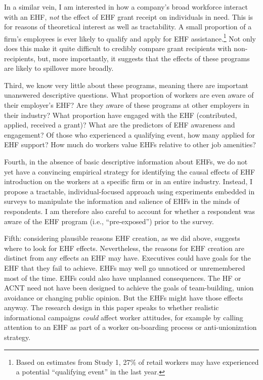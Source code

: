 \documentclass[
  11pt,
  oneside]{article}
\begin{document}
In a similar vein, I am interested in how a company's broad workforce interact with an EHF, \emph{not} the effect of EHF grant receipt on individuals in need. This is for reasons of theoretical interest as well as tractability. A small proportion of a firm's employees is ever likely to qualify and apply for EHF assistance.\footnote{Based on estimates from Study 1, 27\% of retail workers may have experienced a potential ``qualifying event'' in the last year.} Not only does this make it quite difficult to credibly compare grant recipients with non-recipients, but, more importantly, it suggests that the effects of these programs are likely to spillover more broadly.

Third, we know very little about these programs, meaning there are important unanswered descriptive questions. What proportion of workers are even aware of their employer's EHF? Are they aware of these programs at other employers in their industry? What proportion have engaged with the EHF (contributed, applied, received a grant)? What are the predictors of EHF awareness and engagement? Of those who experienced a qualifying event, how many applied for EHF support? How much do workers value EHFs relative to other job amenities?

Fourth, in the absence of basic descriptive information about EHFs, we do not yet have a convincing empirical strategy for identifying the causal effects of EHF introduction on the workers at a specific firm or in an entire industry. Instead, I propose a tractable, individual-focused approach using experiments embedded in surveys to manipulate the information and salience of EHFs in the minds of respondents. I am therefore also careful to account for whether a respondent was aware of the EHF program (i.e., ``pre-exposed'') prior to the survey.

Fifth: considering plausible reasons EHF creation, as we did above, suggests where to look for EHF effects. Nevertheless, the reasons for EHF creation are distinct from any effects an EHF may have. Executives could have goals for the EHF that they fail to achieve. EHFs may well go unnoticed or unremembered most of the time. EHFs could also have unplanned consequences. The HF or ACNT need not have been designed to achieve the goals of team-building, union avoidance or changing public opinion. But the EHFs might have those effects anyway. The research design in this paper speaks to whether realistic informational campaigns \emph{could} affect worker attitudes, for example by calling attention to an EHF as part of a worker on-boarding process or anti-unionization strategy.
\end{document}
